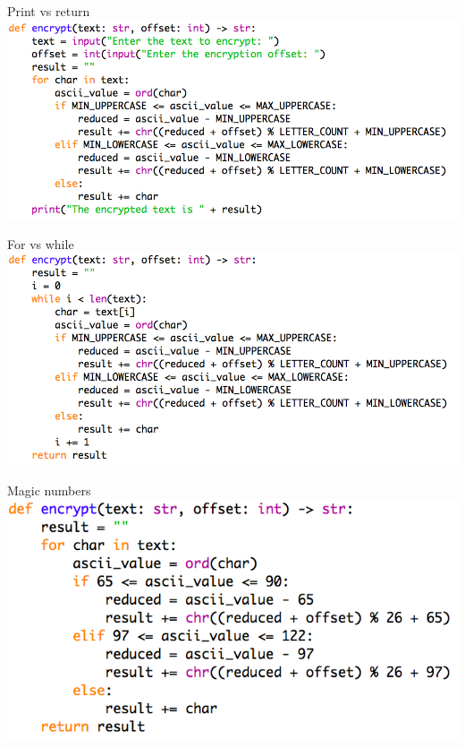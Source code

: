 \documentclass[week2]{csse1001}
\begin{document}
\begin{topic}{Print vs return}
\includegraphics[width=\textwidth]{a1pitfalls/pvr}
\end{topic}

\begin{topic}{For vs while}
\includegraphics[width=\textwidth]{a1pitfalls/while}
\end{topic}

\begin{topic}{Magic numbers}
\includegraphics[width=\textwidth]{a1pitfalls/magic}
\end{topic}
\end{document}
